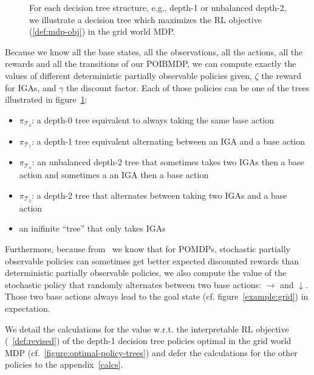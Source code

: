 \begin{figure}
    \caption{For each decision tree structure, e.g., depth-1 or unbalanced depth-2, we illustrate a decision tree which maximizes the RL objective (\ref{def:mdp-obj}) in the grid world MDP.}
    \label{fig:optimal-policy-trees}
\end{figure}

Because we know all the base states, all the observations, all the actions, all the rewards and all the transitions of our POIBMDP, we can compute exactly the values of different deterministic partially observable policies given, $\zeta$ the reward for IGAs, and $\gamma$ the discount factor.
Each of those policies can be one of the trees illustrated in figure~\ref{fig:optimal-policy-trees}: 

\begin{itemize}
    \item $\pi_{\mathcal{T}_0}$: a depth-0 tree equivalent to always taking the same base action 
    \item $\pi_{\mathcal{T}_1}$: a depth-1 tree equivalent alternating between an IGA and a base action 
    \item $\pi_{\mathcal{T}_u}$: an unbalanced depth-2 tree that sometimes takes two IGAs then a base action and sometimes a an IGA then a base action
    \item $\pi_{\mathcal{T}_2}$: a depth-2 tree that alternates between taking two IGAs and a base action
    \item an inifinite ``tree'' that only takes IGAs
\end{itemize}
Furthermore, because from~\cite{learning-pomdp} we know that for POMDPs, stochastic partially observable policies can sometimes get better expected discounted rewards than deterministic partially observable policies, we also compute the value of the stochastic policy that randomly alternates between two base actions: $\rightarrow$ and $\downarrow$.
Those two base actions always lead to the goal state (cf. figure~\ref{example:grid}) in expectation.

We detail the calculations for the value w.r.t. the interpretable RL objective (~\ref{def:revised}) of the depth-1 decision tree policies optimal in the grid world MDP (cf.~\ref{figure:optimal-policy-trees}) and defer the calculations for the other policies to the appendix~\ref{calcs}.

